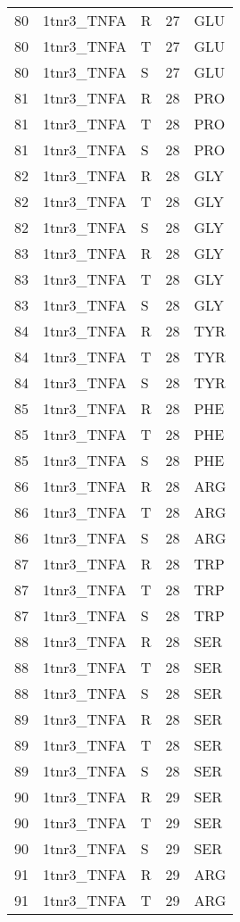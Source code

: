 \begin{longtable}[l]{l|l|l|l|l}
	80 & 1tnr3_TNFA & R & 27 & GLU \\
	80 & 1tnr3_TNFA & T & 27 & GLU \\
	80 & 1tnr3_TNFA & S & 27 & GLU \\
	81 & 1tnr3_TNFA & R & 28 & PRO \\
	81 & 1tnr3_TNFA & T & 28 & PRO \\
	81 & 1tnr3_TNFA & S & 28 & PRO \\
	82 & 1tnr3_TNFA & R & 28 & GLY \\
	82 & 1tnr3_TNFA & T & 28 & GLY \\
	82 & 1tnr3_TNFA & S & 28 & GLY \\
	83 & 1tnr3_TNFA & R & 28 & GLY \\
	83 & 1tnr3_TNFA & T & 28 & GLY \\
	83 & 1tnr3_TNFA & S & 28 & GLY \\
	84 & 1tnr3_TNFA & R & 28 & TYR \\
	84 & 1tnr3_TNFA & T & 28 & TYR \\
	84 & 1tnr3_TNFA & S & 28 & TYR \\
	85 & 1tnr3_TNFA & R & 28 & PHE \\
	85 & 1tnr3_TNFA & T & 28 & PHE \\
	85 & 1tnr3_TNFA & S & 28 & PHE \\
	86 & 1tnr3_TNFA & R & 28 & ARG \\
	86 & 1tnr3_TNFA & T & 28 & ARG \\
	86 & 1tnr3_TNFA & S & 28 & ARG \\
	87 & 1tnr3_TNFA & R & 28 & TRP \\
	87 & 1tnr3_TNFA & T & 28 & TRP \\
	87 & 1tnr3_TNFA & S & 28 & TRP \\
	88 & 1tnr3_TNFA & R & 28 & SER \\
	88 & 1tnr3_TNFA & T & 28 & SER \\
	88 & 1tnr3_TNFA & S & 28 & SER \\
	89 & 1tnr3_TNFA & R & 28 & SER \\
	89 & 1tnr3_TNFA & T & 28 & SER \\
	89 & 1tnr3_TNFA & S & 28 & SER \\
	90 & 1tnr3_TNFA & R & 29 & SER \\
	90 & 1tnr3_TNFA & T & 29 & SER \\
	90 & 1tnr3_TNFA & S & 29 & SER \\
	91 & 1tnr3_TNFA & R & 29 & ARG \\
	91 & 1tnr3_TNFA & T & 29 & ARG \\

\end{longtable}
